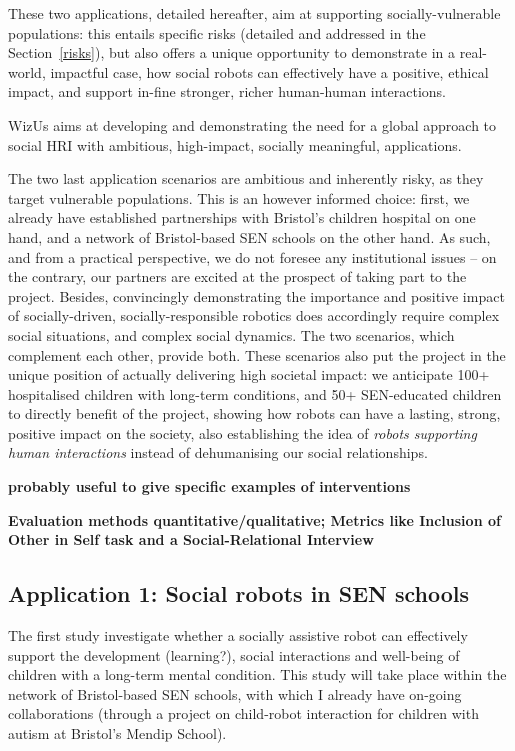 \documentclass[11pt,a4paper]{report}
\newcommand{\project}{WizUs\xspace}
\newcommand{\TODO}[1]{{\color{red}\textbf{#1}}}
\begin{document}
These two applications, detailed hereafter, aim at supporting
socially-vulnerable populations: this entails specific risks (detailed and
addressed in the Section~\ref{risks}), but also offers a unique opportunity to
demonstrate in a real-world, impactful case, how social robots can effectively
have a positive, ethical impact, and support in-fine stronger, richer
human-human interactions.


\project aims at developing and demonstrating the need for a global approach to
social HRI with ambitious, high-impact, socially meaningful, applications.

The two last application scenarios are ambitious and inherently risky, as they
target vulnerable populations. This is an however informed choice: first, we
already have established partnerships with Bristol's children hospital on one
hand, and a network of Bristol-based SEN schools on the other hand. As such, and
from a practical perspective, we do not foresee any institutional issues -- on
the contrary, our partners are excited at the prospect of taking part to the
project. Besides, convincingly demonstrating the importance and positive impact
of socially-driven, socially-responsible robotics does accordingly require
complex social situations, and complex social dynamics. The two scenarios, which
complement each other, provide both. These scenarios also put the project in the
unique position of actually delivering high societal impact: we anticipate 100+
hospitalised children with long-term conditions, and 50+ SEN-educated children
to directly benefit of the project, showing how robots can have a lasting,
strong, positive impact on the society, also establishing the idea of
\emph{robots supporting human interactions} instead of dehumanising our social
relationships.


\TODO{probably useful to give specific examples of interventions}

\TODO{Evaluation methods quantitative/qualitative; Metrics like Inclusion of Other in Self task
and a Social-Relational Interview~\cite{westlund2017measuring}}

\subsection{Application 1: Social robots in SEN schools}


The first study investigate whether a socially assistive robot can effectively support the development (learning?),
social interactions and well-being of children with a long-term mental
condition. This study will take place within the network of
Bristol-based SEN schools, with which I already have on-going collaborations
(through a project on child-robot interaction for children with autism at Bristol's Mendip School).
\end{document}
